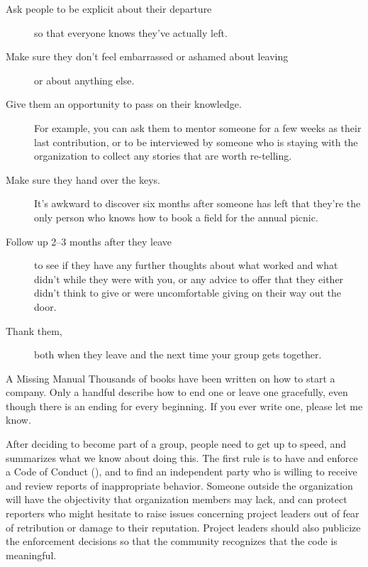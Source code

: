 \begin{description}

\item[Ask people to be explicit about their departure]
  so that everyone knows they've actually left.

\item[Make sure they don't feel embarrassed or ashamed about leaving]
  or about anything else.

\item[Give them an opportunity to pass on their knowledge.]
  For example,
  you can ask them to mentor someone for a few weeks as   their last contribution,
  or to be interviewed by someone who is staying with the organization
  to collect any stories that are worth re-telling.

\item[Make sure they hand over the keys.]
  It's awkward to discover six months after someone has left
  that they're the only person who knows how to book a field for the annual picnic.

\item[Follow up 2--3 months after they leave]
  to see if they have any further thoughts about what worked and what didn't while they were with you,
  or any advice to offer that they either didn't think to give
  or were uncomfortable giving on their way out the door.

\item[Thank them,]
  both when they leave and the next time your group gets together.

\end{description}

\begin{aside}{A Missing Manual}
  Thousands of books have been written on how to start a company.
  Only a handful describe how to end one or leave one gracefully,
  even though there is an ending for every beginning.
  If you ever write one,
  please let me know.
\end{aside}


After deciding to become part of a group,
people need to get up to speed,
and \cite{Shol2019} summarizes what we know about doing this.
The first rule is to have and enforce a Code of Conduct (),
and to find an independent party who is willing to receive and review reports of inappropriate behavior.
Someone outside the organization will have the objectivity that organization members may lack,
and can protect reporters who might hesitate to raise issues concerning project leaders
out of fear of retribution or damage to their reputation.
Project leaders should also publicize the enforcement decisions
so that the community recognizes that the code is meaningful.

